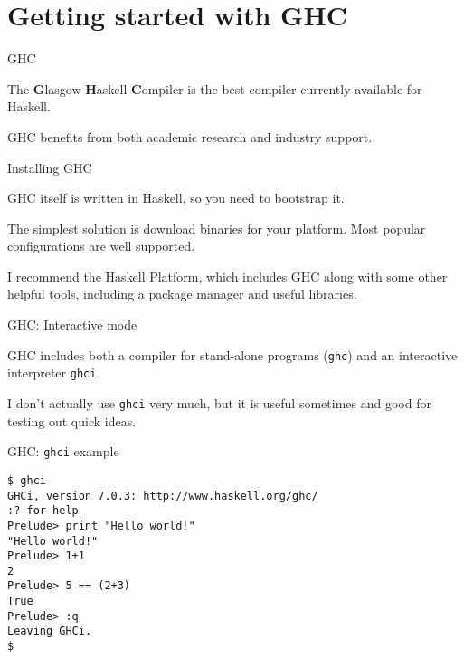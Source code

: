 
\section{Getting started with GHC}

%
\begin{frame}{GHC}

The \textbf{G}lasgow \textbf{H}askell \textbf{C}ompiler is the best compiler
currently available for Haskell.

GHC benefits from both academic research and industry support.

\end{frame}

%
\begin{frame}{Installing GHC}

GHC itself is written in Haskell, so you need to bootstrap it. 

The simplest solution is download binaries for your platform. Most popular
configurations are well supported.

I recommend the Haskell Platform, which includes GHC along with some other
helpful tools, including a package manager and useful libraries.


\end{frame}

%
\begin{frame}{GHC: Interactive mode}

GHC includes both a compiler for stand-alone programs (\texttt{ghc}) and an
interactive interpreter \texttt{ghci}.

I don't actually use \texttt{ghci} very much, but it is useful sometimes and
good for testing out quick ideas.

\end{frame}

%
\begin{frame}[fragile]{GHC: \texttt{ghci} example}

\begin{verbatim}
$ ghci
GHCi, version 7.0.3: http://www.haskell.org/ghc/
:? for help
Prelude> print "Hello world!"
"Hello world!"
Prelude> 1+1
2
Prelude> 5 == (2+3)
True
Prelude> :q
Leaving GHCi.
$
\end{verbatim}

\end{frame}

